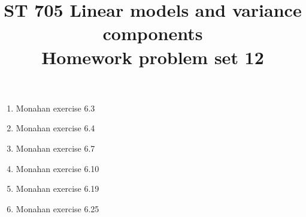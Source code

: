 \documentclass[11pt]{article}
\title{ST 705 Linear models and variance components \\ 
        Homework problem set 12}
\begin{document}
\maketitle

\begin{enumerate}

\item Monahan exercise 6.3

\item Monahan exercise 6.4

\item Monahan exercise 6.7

\item Monahan exercise 6.10

\item Monahan exercise 6.19

\item Monahan exercise 6.25

\end{enumerate}
\end{document}

